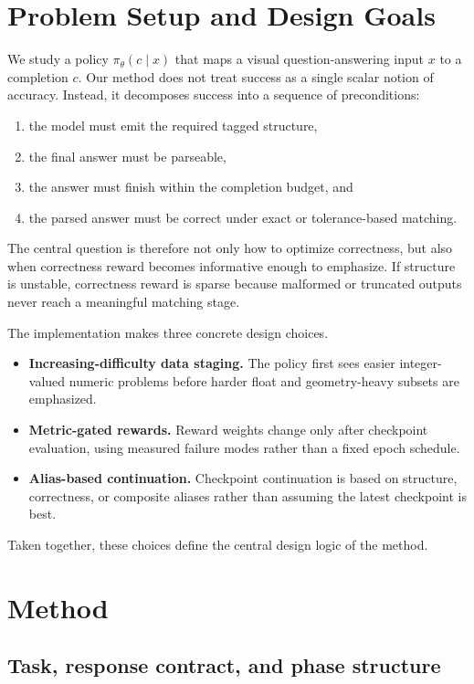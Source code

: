 \documentclass{article} %
\begin{document}
\section{Problem Setup and Design Goals}

We study a policy $\pi_\theta(c \mid x)$ that maps a visual question-answering input $x$ to a completion $c$. Our method does not treat success as a single scalar notion of accuracy. Instead, it decomposes success into a sequence of preconditions:
\begin{enumerate}[leftmargin=1.2em]
\item the model must emit the required tagged structure,
\item the final answer must be parseable,
\item the answer must finish within the completion budget, and
\item the parsed answer must be correct under exact or tolerance-based matching.
\end{enumerate}
The central question is therefore not only how to optimize correctness, but also when correctness reward becomes informative enough to emphasize. If structure is unstable, correctness reward is sparse because malformed or truncated outputs never reach a meaningful matching stage.

The implementation makes three concrete design choices.
\begin{itemize}[leftmargin=1.2em]
\item \textbf{Increasing-difficulty data staging.} The policy first sees easier integer-valued numeric problems before harder float and geometry-heavy subsets are emphasized.
\item \textbf{Metric-gated rewards.} Reward weights change only after checkpoint evaluation, using measured failure modes rather than a fixed epoch schedule.
\item \textbf{Alias-based continuation.} Checkpoint continuation is based on structure, correctness, or composite aliases rather than assuming the latest checkpoint is best.
\end{itemize}
Taken together, these choices define the central design logic of the method.

\section{Method}

\subsection{Task, response contract, and phase structure}
\end{document}
